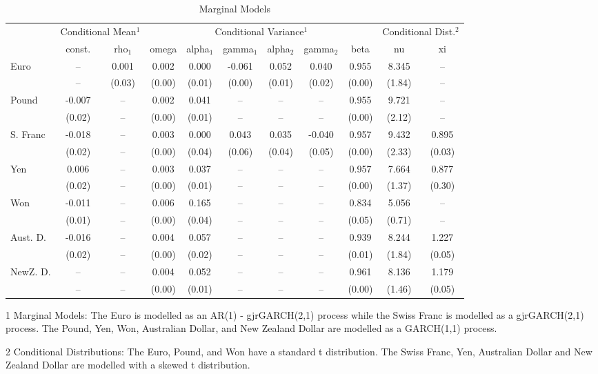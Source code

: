 \documentclass[12pt]{article}
\begin{document}
\begin{landscape}

\begin{table}
\caption{Marginal Models}
\begin{threeparttable}
	\begin{tabular}[l]{l c c | c c c c c c | c c}
\hline \hline
& \multicolumn{2}{c}{Conditional Mean$^{1}$} & \multicolumn{6}{c}{Conditional Variance$^{1}$} & \multicolumn{2}{c}{Conditional Dist.$^{2}$} \\
& const. & rho$_{1}$ & omega & alpha$_{1}$ & gamma$_{1}$ & alpha$_{2}$ & gamma$_{2}$ & beta & nu & xi \\
\hline
Euro  & -- &  0.001 & 0.002 & 0.000 & -0.061 & 0.052 & 0.040 & 0.955 & 8.345 & -- \\
      & -- & (0.03) &(0.00) &(0.01) & (0.00) &(0.01) &(0.02) &(0.00) &(1.84) & -- \\
Pound & -0.007 & -- & 0.002 & 0.041 & -- & -- & -- & 0.955 & 9.721 & -- \\
      & (0.02) & -- &(0.00) &(0.01) & -- & -- & -- &(0.00) &(2.12) & -- \\
S. Franc & -0.018 & -- & 0.003 & 0.000 & 0.043 & 0.035 & -0.040 & 0.957 & 9.432 & 0.895 \\
		 & (0.02) & -- &(0.00) &(0.04) &(0.06) &(0.04) & (0.05) &(0.00) &(2.33) &(0.03) \\
Yen & 0.006 & -- & 0.003 & 0.037 & -- & -- & -- & 0.957 & 7.664 & 0.877 \\
    &(0.02) & -- &(0.00) &(0.01) & -- & -- & -- &(0.00) &(1.37) & (0.30) \\
Won & -0.011 & -- & 0.006 & 0.165 & -- & -- & -- & 0.834 & 5.056 & -- \\
    & (0.01) & -- &(0.00) &(0.04) & -- & -- & -- &(0.05) &(0.71) & -- \\
Aust. D. & -0.016 & -- & 0.004 & 0.057 & -- & -- & -- & 0.939 & 8.244 & 1.227 \\
         & (0.02) & -- &(0.00) &(0.02) & -- & -- & -- &(0.01) &(1.84) &(0.05) \\
NewZ. D. & -- & -- & 0.004 & 0.052 & -- & -- & -- & 0.961 & 8.136 & 1.179 \\
         & -- & -- &(0.00) &(0.01) & -- & -- & -- &(0.00) &(1.46) &(0.05) \\
\hline \hline
	\end{tabular}
	\begin{tablenotes}
		\item[1]{\footnotesize Marginal Models: The Euro is modelled as an AR(1) - gjrGARCH(2,1) process while the Swiss Franc is modelled as a gjrGARCH(2,1) process. The Pound, Yen, Won, Australian Dollar, and New Zealand Dollar are modelled as a GARCH(1,1) process.}
		\item[2]{\footnotesize Conditional Distributions: The Euro, Pound, and Won have a standard t distribution. The Swiss Franc, Yen, Australian Dollar and New Zealand Dollar are modelled with a skewed t distribution.}
	\end{tablenotes}
\end{threeparttable}
\end{table}

\end{landscape}
\end{document}
